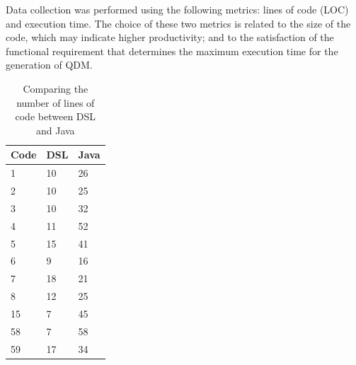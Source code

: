 Data collection was performed using the following metrics: lines of code (LOC) and execution time. The choice of these two metrics is related to the size of the code, which may indicate higher productivity; and to the satisfaction of the functional requirement that determines the maximum execution time for the generation of QDM.


\begin{table}[htb!]
\centering
\caption{Comparing the number of lines of code between DSL and Java}
\label{table:comparacao}
\begin{center}
\begin{tabular}{lll}
\hline
\textbf{Code} & \textbf{DSL} & \textbf{Java}     \\ \hline 
1        & 10  & 26   \\ \hline
2        & 10  & 25   \\ \hline
3        & 10  & 32   \\ \hline
4        & 11  & 52   \\ \hline
5        & 15  & 41   \\ \hline
6        & 9   & 16   \\ \hline
7        & 18  & 21   \\ \hline
8        & 12  & 25   \\ \hline
15       & 7   & 45   \\ \hline
58       & 7   & 58   \\ \hline
59       & 17  & 34   \\ \hline
\end{tabular}
\end{center}
\end{table}


